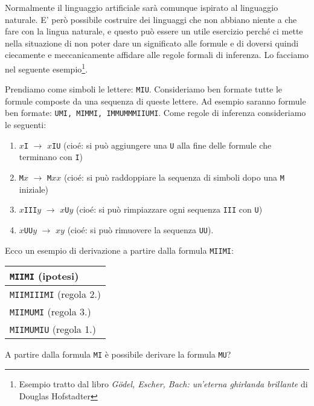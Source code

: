 \documentclass[italian,a4paper,hidelinks,headinclude]{scrartcl}
\begin{document}
 Normalmente
il linguaggio artificiale sarà comunque ispirato al linguaggio
naturale. E' però possibile costruire dei linguaggi che non abbiano
niente a che fare con la lingua naturale, e questo può essere un utile
esercizio perché ci mette nella situazione di non poter dare un significato
alle formule e di doversi quindi ciecamente e meccanicamente affidare
alle regole formali di inferenza. Lo facciamo nel seguente
esempio\footnote{%
  Esempio tratto dal libro
    \emph{G\"odel, Escher, Bach: un'eterna ghirlanda brillante} di
    Douglas Hofstadter}.

\begin{example}
Prendiamo come simboli le lettere: \texttt{MIU}.
Consideriamo ben formate tutte
le formule composte da una sequenza di queste lettere. Ad esempio
saranno formule ben formate: \texttt{UMI, MIMMI, IMMUMMMIIUMI}. Come
regole di inferenza consideriamo le seguenti:
\begin{enumerate}
\item  $x$\texttt{I} $\to$ $x$\texttt{IU} (cioé: si può aggiungere una
  \texttt{U} alla fine delle formule che terminano con \texttt{I})
\item \texttt{M}$x$ $\to$ \texttt{M}$xx$ (cioé: si può raddoppiare la
  sequenza di simboli dopo una \texttt{M} iniziale)
\item $x$\texttt{III}$y$ $\to$ $x$\texttt{U}$y$ (cioé: si può
  rimpiazzare ogni sequenza \texttt{III} con \texttt{U})
\item $x$\texttt{UU}$y$ $\to$ $xy$ (cioé: si può rimuovere la sequenza \texttt{UU}).
\end{enumerate}
Ecco un esempio di derivazione a partire dalla formula \texttt{MIIMI}:
\begin{center}
  \begin{tabular}{l}
    \texttt{MIIMI} (ipotesi)\\\hline
    \texttt{MIIMIIIMI} (regola 2.)\\
    \texttt{MIIMUMI} (regola 3.)\\
    \texttt{MIIMUMIU} (regola 1.)\\
  \end{tabular}
\end{center}

A partire dalla formula \texttt{MI} è possibile derivare la formula \texttt{MU}?
\end{example}
\end{document}
